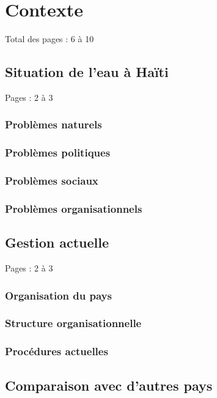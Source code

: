 \documentclass{eplmastersthesis_FR}
\begin{document}

	\chapter{Contexte}

		Total des pages : 6 à 10

		\section{Situation de l'eau à Haïti}

			Pages : 2 à 3

			\subsection*{Problèmes naturels}
			\subsection*{Problèmes politiques}
			\subsection*{Problèmes sociaux}
			\subsection*{Problèmes organisationnels}

		\section{Gestion actuelle}

			Pages : 2 à 3

			\subsection*{Organisation du pays}
			\subsection*{Structure organisationnelle}
			\subsection*{Procédures actuelles}

		\section{Comparaison avec d'autres pays}
\end{document}
